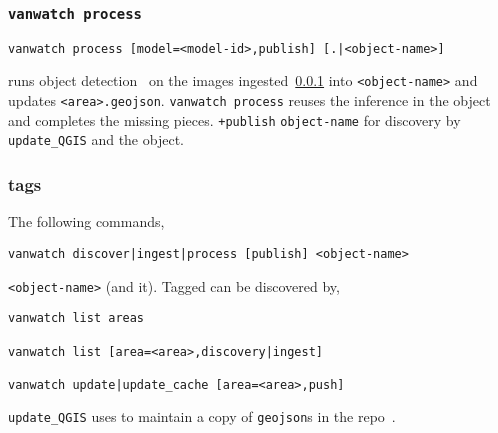 \subsubsection{\texttt{vanwatch process}}
\label{vanwatch_process}

\begin{verbatim}
vanwatch process [model=<model-id>,publish] [.|<object-name>]
\end{verbatim}
%
runs object detection~ on the images ingested~\ref{vanwatch_process} into \texttt{<object-name>} and updates \texttt{<area>.geojson}. \texttt{vanwatch process} reuses the inference in the object and completes the missing pieces. \texttt{+publish}  \texttt{object-name} for discovery by \texttt{update\_QGIS} and  the object.

\subsubsection{tags}
\label{vanwatch_tags}

The following commands,

\begin{verbatim}
vanwatch discover|ingest|process [publish] <object-name>
\end{verbatim}
%
 \texttt{<object-name>} (and  it). Tagged  can be discovered by,
%
\begin{verbatim}
vanwatch list areas

vanwatch list [area=<area>,discovery|ingest]

vanwatch update|update_cache [area=<area>,push]
\end{verbatim}
%
\texttt{update\_QGIS} uses  to maintain a copy of \texttt{geojson}s in the repo~.